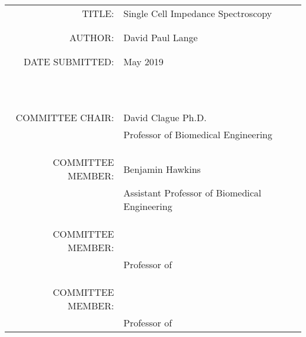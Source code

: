 \vspace{0.5 in}

\begin{tabular}{r l}
    TITLE:\;\;\;\;\; & Single Cell Impedance Spectroscopy\\
    \\
    \\
    AUTHOR:\;\;\;\;\; & David Paul Lange\\
    \\
    \\
    DATE SUBMITTED:\;\;\;\;\;\; & May 2019\\
    \\
    \\
    \\
    \\
    \\
    \\
    \\
    \\
    \\
    \\
    \\
    COMMITTEE CHAIR:\;\;\;\;\; & David Clague Ph.D.\\ 
    \;\;\;\;\; & Professor of Biomedical Engineering\\
    \\
    \\
    \\
    COMMITTEE MEMBER: \;\;\;\;\; & Benjamin Hawkins\\
    \;\;\;\;\; & Assistant Professor of Biomedical Engineering\\
    \\
    \\
    \\
    COMMITTEE MEMBER: \;\;\;\;\; & \\
    \;\;\;\;\; & Professor of \\
    \\
    \\
    \\
    COMMITTEE MEMBER: \;\;\;\;\; & \\
    \;\;\;\;\; & Professor of \\
\end{tabular}


